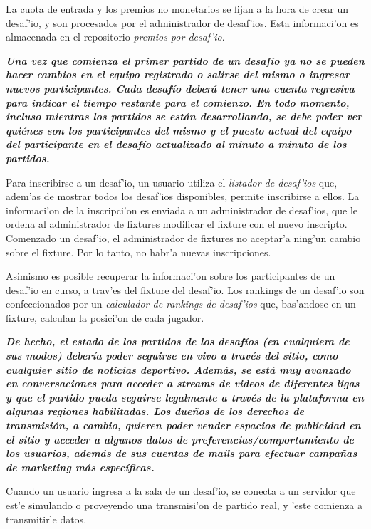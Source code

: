 La cuota de entrada y los premios no monetarios se fijan a la hora de crear un desaf'io, y son procesados por el administrador de desaf'ios. Esta informaci'on es almacenada en el repositorio \textit{premios por desaf'io}.

\textbf{\textit{Una vez que comienza el primer partido de un desafío ya no se pueden hacer cambios en el equipo registrado o salirse del mismo o ingresar nuevos participantes. Cada desafío deberá tener una cuenta regresiva para indicar el tiempo restante para el comienzo. En todo momento, incluso mientras los partidos se están desarrollando, se debe poder ver quiénes son los participantes del mismo y el puesto actual del equipo del participante en el desafío actualizado al minuto a minuto de los partidos.}}

Para inscribirse a un desaf'io, un usuario utiliza el \textit{listador de desaf'ios} que, adem'as de mostrar todos los desaf'ios disponibles, permite inscribirse a ellos. La informaci'on de la inscripci'on es enviada a un administrador de desaf'ios, que le ordena al administrador de fixtures modificar el fixture con el nuevo inscripto. Comenzado un desaf'io, el administrador de fixtures no aceptar'a ning'un cambio sobre el fixture. Por lo tanto, no habr'a nuevas inscripciones.

Asimismo es posible recuperar la informaci'on sobre los participantes de un desaf'io en curso, a trav'es del fixture del desaf'io. Los rankings de un desaf'io son confeccionados por un \textit{calculador de rankings de desaf'ios} que, bas'andose en un fixture, calculan la posici'on de cada jugador.

\textbf{\textit{
De hecho, el estado de los partidos de los desafíos (en cualquiera de sus modos) debería poder seguirse en vivo a través del sitio, como cualquier sitio de noticias deportivo. Además, se está muy avanzado en conversaciones para acceder a streams de videos de diferentes ligas y que el partido pueda seguirse legalmente a través de la plataforma en algunas regiones habilitadas. Los dueños de los derechos de transmisión, a cambio, quieren poder vender espacios de publicidad en el sitio y acceder a algunos datos de preferencias/comportamiento de los usuarios, además de sus cuentas de mails para efectuar campañas de marketing más específicas.
}}

Cuando un usuario ingresa a la sala de un desaf'io, se conecta a un servidor que est'e simulando o proveyendo una transmisi'on de partido real, y 'este comienza a transmitirle datos.

